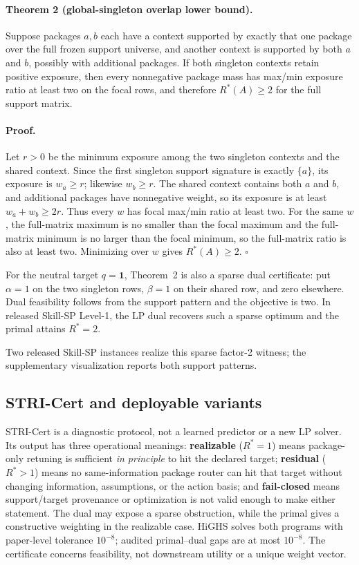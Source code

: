 \paragraph{Theorem 2 (global-singleton overlap lower bound).}
Suppose packages $a,b$ each have a context supported by exactly that one package over the full frozen support universe, and another context is supported by both $a$ and $b$, possibly with additional packages. If both singleton contexts retain positive exposure, then every nonnegative package mass has max/min exposure ratio at least two on the focal rows, and therefore $R^*(A)\ge2$ for the full support matrix.

\paragraph{Proof.}
Let $r>0$ be the minimum exposure among the two singleton contexts and the shared context. Since the first singleton support signature is exactly $\{a\}$, its exposure is $w_a\ge r$; likewise $w_b\ge r$. The shared context contains both $a$ and $b$, and additional packages have nonnegative weight, so its exposure is at least $w_a+w_b\ge2r$. Thus every $w$ has focal max/min ratio at least two. For the same $w$, the full-matrix maximum is no smaller than the focal maximum and the full-matrix minimum is no larger than the focal minimum, so the full-matrix ratio is also at least two. Minimizing over $w$ gives $R^*(A)\ge2$. \hfill$\square$

For the neutral target $q=\mathbf1$, Theorem~2 is also a sparse dual certificate: put $\alpha=1$ on the two singleton rows, $\beta=1$ on their shared row, and zero elsewhere. Dual feasibility follows from the support pattern and the objective is two. In released Skill-SP Level-1, the LP dual recovers such a sparse optimum and the primal attains $R^*=2$.

Two released Skill-SP instances realize this sparse factor-2 witness; the supplementary visualization reports both support patterns.

\subsection{STRI-Cert and deployable variants}
STRI-Cert is a diagnostic protocol, not a learned predictor or a new LP solver. Its output has three operational meanings: \textbf{realizable} ($R^*=1$) means package-only retuning is sufficient \emph{in principle} to hit the declared target; \textbf{residual} ($R^*>1$) means no same-information package router can hit that target without changing information, assumptions, or the action basis; and \textbf{fail-closed} means support/target provenance or optimization is not valid enough to make either statement. The dual may expose a sparse obstruction, while the primal gives a constructive weighting in the realizable case. HiGHS solves both programs with paper-level tolerance $10^{-8}$; audited primal--dual gaps are at most $10^{-8}$. The certificate concerns feasibility, not downstream utility or a unique weight vector.

